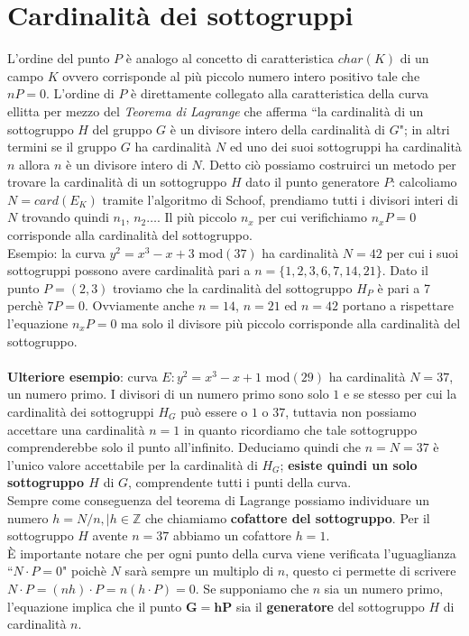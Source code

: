\documentclass[a4paper,12pt]{tesiinfo}
\begin{document}
\section{Cardinalit\`a dei sottogruppi}
L'ordine del punto $P$ \`e analogo al concetto di caratteristica $char(K)$ di un campo $K$ ovvero corrisponde al pi\`u piccolo numero intero positivo tale che $nP = 0$. L'ordine di $P$ \`e direttamente collegato alla caratteristica della curva ellitta per mezzo del \textit{Teorema di Lagrange} che afferma ``la cardinalit\`a di un sottogruppo $H$ del gruppo $G$ \`e un divisore intero della cardinalit\`a di $G$"; in altri termini se il gruppo $G$ ha cardinalit\`a $N$ ed uno dei suoi sottogruppi ha cardinalit\`a $n$ allora $n$ \`e un divisore intero di $N$. Detto ci\`o possiamo costruirci un metodo per trovare la cardinalit\`a di un sottogruppo $H$ dato il punto generatore $P$: calcoliamo $N = card(E_K)$ tramite l'algoritmo di Schoof, prendiamo tutti i divisori interi di $N$ trovando quindi $n_1$, $n_2 \ldots$. Il pi\`u piccolo $n_x$ per cui verifichiamo $n_xP = 0$ corrisponde alla cardinalit\`a del sottogruppo.
\\
Esempio: la curva $y^2 = x^3-x+3$ mod$(37)$ ha cardinalit\`a $N=42$ per cui i suoi sottogruppi possono avere cardinalit\`a pari a $n= \{1, 2, 3, 6, 7, 14, 21\}$. Dato il punto $P=(2, 3)$ troviamo che la cardinalit\`a del sottogruppo $H_P$ \`e pari a 7 perch\`e $7P = 0$. Ovviamente anche $n = 14$, $n = 21$ ed $n=42$ portano a rispettare l'equazione $n_xP=0$ ma solo il divisore pi\`u piccolo corrisponde alla cardinalit\`a del sottogruppo.
\\
\\
\textbf{Ulteriore esempio}: curva $E: y^2 = x^3 -x+1$ mod$(29)$ ha cardinalit\`a $N=37$, un numero primo. I divisori di un numero primo sono solo $1$ e se stesso per cui la cardinalit\`a dei sottogruppi $H_G$ pu\`o essere o $1$ o $37$, tuttavia non possiamo accettare una cardinalit\`a $n=1$ in quanto ricordiamo che tale sottogruppo comprenderebbe solo il punto all'infinito. Deduciamo quindi che $n = N = 37$ \`e l'unico valore accettabile per la cardinalit\`a di $H_G$; \textbf{esiste quindi un solo sottogruppo $H$} di $G$, comprendente tutti i punti della curva.
\\
Sempre come conseguenza del teorema di Lagrange possiamo individuare un numero $h= N \big / n, \mid h \in \mathbb{Z}$ che chiamiamo \textbf{cofattore del sottogruppo}. Per il sottogruppo $H$ avente $n=37$ abbiamo un cofattore $h=1$.
\\
\`E importante notare che per ogni punto della curva viene verificata l'uguaglianza ``$N \cdot P=0$" poich\`e $N$ sar\`a sempre un multiplo di $n$, questo ci permette di scrivere \\$N \cdot P = (nh) \cdot P = n(h\cdot P)=0$. Se supponiamo che $n$ sia un numero primo, l'equazione implica che il punto $\mathbold{G = hP}$ sia il \textbf{generatore} del sottogruppo $H$ di cardinalit\`a $n$.
\end{document}

